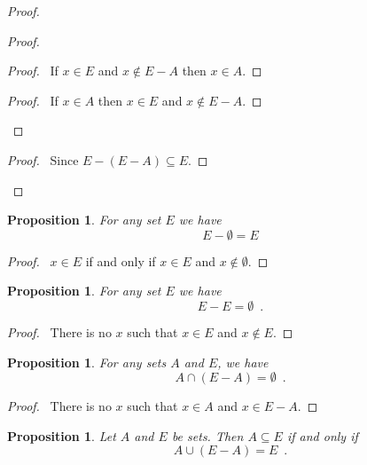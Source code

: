 \documentclass{report}
\let\qed\relax
\newtheorem{prop}[ax]{Proposition}
\theoremstyle{definition}
\begin{document}
\begin{proof}
\pf
{}
\begin{proof}
	\begin{proof}
		\pf\ If $x \in E$ and $x \notin E - A$ then $x \in A$.
	\end{proof}
	\begin{proof}
		\pf\ If $x \in A$ then $x \in E$ and $x \notin E - A$.
	\end{proof}
\end{proof}
\begin{proof}
	\pf\ Since $E - (E - A) \subseteq E$.
\end{proof}
\qed
\end{proof}

\begin{prop}
For any set $E$ we have
\[ E - \emptyset = E \]
\end{prop}

\begin{proof}
\pf\ $x \in E$ if and only if $x \in E$ and $x \notin \emptyset$. \qed
\end{proof}

\begin{prop}
For any set $E$ we have
\[ E - E = \emptyset \enspace . \]
\end{prop}

\begin{proof}
\pf\ There is no $x$ such that $x \in E$ and $x \notin E$. \qed
\end{proof}

\begin{prop}
For any sets $A$ and $E$, we have
\[ A \cap (E - A) = \emptyset \enspace . \]
\end{prop}

\begin{proof}
\pf\ There is no $x$ such that $x \in A$ and $x \in E - A$. \qed
\end{proof}

\begin{prop}
Let $A$ and $E$ be sets. Then $A \subseteq E$ if and only if
\[ A \cup (E - A) = E \enspace . \]
\end{prop}
\end{document}
